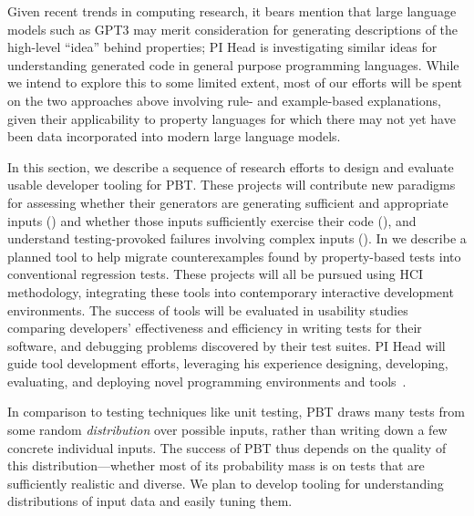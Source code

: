 Given recent trends in computing research, it bears mention that large language
models such as GPT3 may merit consideration for generating descriptions of the
high-level ``idea'' behind properties; PI Head is investigating similar ideas
for understanding generated code in general purpose programming languages. While
we intend to explore this to some limited extent, most of our efforts will be
spent on the two approaches above involving rule- and example-based
explanations, given their applicability to property languages for which there
may not yet have been data incorporated into modern large language models.

\iflater{}\fi


In this section, we
describe a sequence of research efforts to design and evaluate usable developer
tooling for PBT. These projects will contribute new paradigms for assessing whether their generators are generating sufficient and
appropriate inputs () and whether those
inputs sufficiently exercise their code (),
and understand testing-provoked failures involving complex inputs
().
%
In  we describe a planned tool to help migrate
counterexamples found by property-based tests into conventional
regression tests.
%
These projects will all be pursued using HCI
methodology, integrating these tools into contemporary interactive development
environments. The success of tools will be evaluated in usability studies
comparing developers' effectiveness and efficiency in writing tests for their
software, and debugging problems discovered by their test suites.  PI Head will
guide tool development efforts, leveraging his
experience designing, developing, evaluating, and deploying novel programming
environments and
tools~\cite{ref:head2015tutorons,ref:suzuki2017tracediff,ref:head2017writing,ref:head2018when,ref:head2018interactive,ref:head2019managing,ref:head2020composing}.

%
In comparison to testing techniques like unit testing, PBT draws many
tests from some
random {\em distribution} over possible inputs, rather than writing down a few
concrete individual inputs. The success  of
PBT thus depends on the quality of this distribution---whether
most of its probability mass is on tests that are sufficiently
realistic and diverse. We plan
to develop tooling for
understanding distributions of input data and easily tuning them.


